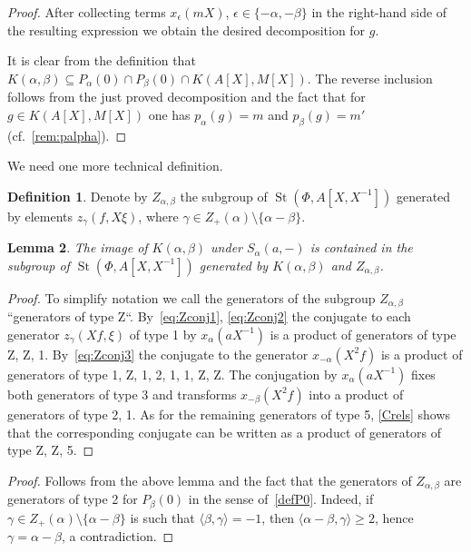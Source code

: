 \documentclass[oneside, 8pt]{amsart}
\newtheorem{lemma}{Lemma}
\newtheorem{corollary}[lemma]{Corollary}
\theoremstyle{remark}
\theoremstyle{definition}
\numberwithin{lemma}{section}
\numberwithin{prop}{section}
\numberwithin{corollary}{section}
\numberwithin{externaltheorem}{section}
\newtheorem{df}[lemma]{Definition} \Crefname{df}{Definition}{Definitions}
\DeclareMathOperator{\St}{St}
\numberwithin{equation}{section}
\begin{document}
\begin{proof}
 After collecting terms $x_\epsilon(mX)$, $\epsilon \in \{ -\alpha, -\beta \}$ in the right-hand side of the resulting expression we obtain the desired decomposition for $g$.
 
 It is clear from the definition that $K(\alpha, \beta) \subseteq P_\alpha(0) \cap P_\beta(0) \cap K(A[X], M[X])$. The reverse inclusion follows from the just proved decomposition and the fact that for $g\in K(A[X], M[X])$ one has $p_{\alpha}(g) = m$ and $p_\beta(g) = m'$ (cf.~\cref{rem:palpha}). \end{proof}
 
We need one more technical definition.
\begin{df} Denote by $Z_{\alpha, \beta}$ the subgroup of $\St(\Phi, A[X, X^{-1}])$ generated by elements $z_\gamma(f, X\xi)$, where $\gamma \in Z_+(\alpha) \setminus \{ \alpha - \beta \}$.\end{df}
  
\begin{lemma} \label{image-K-a-b} The image of $K(\alpha, \beta)$ under $S_{\alpha}(a, -)$ is contained in the subgroup of $\St(\Phi, A[X, X^{-1}])$  generated by $K(\alpha, \beta)$ and $Z_{\alpha, \beta}$. \end{lemma}
\begin{proof} To simplify notation we call the generators of the subgroup $Z_{\alpha,\beta}$ ``generators of type Z``. By~\eqref{eq:Zconj1}, \eqref{eq:Zconj2} the conjugate to each generator $z_\gamma(Xf, \xi)$ of type 1 by $x_\alpha(aX^{-1})$ is a product of generators of type Z, Z, 1.
By~\eqref{eq:Zconj3} the conjugate to the generator $x_{-\alpha}(X^2f)$ is a product of generators of type 1, Z, 1, 2, 1, 1, Z, Z.
The conjugation by $x_\alpha(aX^{-1})$ fixes both generators of type 3 and transforms $x_{-\beta}(X^2f)$ into a product of generators of type 2, 1. As for the remaining generators of type 5, \cref{Crels} shows that the corresponding conjugate can be written as a product of generators of type Z, Z, 5. \end{proof}  

\begin{proof} Follows from the above lemma and the fact that the generators of $Z_{\alpha,\beta}$ are generators of type 2 for $P_\beta(0)$ in the sense of~\cref{defP0}.
 Indeed, if $\gamma \in Z_+(\alpha) \setminus \{ \alpha - \beta \}$ is such that $\langle \beta, \gamma \rangle = -1$, then $ \langle \alpha - \beta, \gamma \rangle \geq 2$, hence
  $\gamma = \alpha - \beta$, a contradiction. \end{proof}
\end{document}
